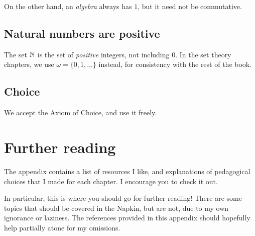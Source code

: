 On the other hand, an \emph{algebra} always has $1$,
but it need not be commutative.

\subsection{Natural numbers are positive}
The set $\mathbb N$ is the set of \emph{positive} integers, not including $0$.
In the set theory chapters, we use $\omega = \{0, 1, \dots\}$
instead, for consistency with the rest of the book.

\subsection{Choice}
We accept the Axiom of Choice, and use it freely.

\section{Further reading}
The appendix  contains a list of resources I like,
and explanations of pedagogical choices that I made for each chapter.
I encourage you to check it out.

In particular, this is where you should go for further reading!
There are some topics that should be covered in the Napkin,
but are not, due to my own ignorance or laziness.
The references provided in this appendix should hopefully help partially
atone for my omissions.
